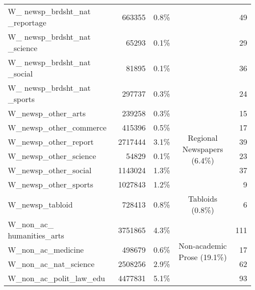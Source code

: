 {\begin{tabular}{lrrcr}
        W\_ newsp\_brdsht\_nat \_reportage & 663355   & 0.8\%   &                                                         & 49    \\
        W\_ newsp\_brdsht\_nat \_science   & 65293    & 0.1\%   &                                                         & 29    \\
        W\_ newsp\_brdsht\_nat \_social    & 81895    & 0.1\%   &                                                         & 36    \\
        W\_ newsp\_brdsht\_nat \_sports    & 297737   & 0.3\%   &                                                         & 24    \\ \cline{4-4}
        W\_newsp\_other\_arts              & 239258   & 0.3\%   & \multirow{6}{*}{\parbox{2.1cm}{Regional Newspapers (6.4\%)}}    & 15    \\
        W\_newsp\_other\_commerce          & 415396   & 0.5\%   &                                                         & 17    \\
        W\_newsp\_other\_report            & 2717444  & 3.1\%   &                                                         & 39    \\
        W\_newsp\_other\_science           & 54829    & 0.1\%   &                                                         & 23    \\
        W\_newsp\_other\_social            & 1143024  & 1.3\%   &                                                         & 37    \\
        W\_newsp\_other\_sports            & 1027843  & 1.2\%   &                                                         & 9     \\ \cline{4-4}
        W\_newsp\_tabloid                  & 728413   & 0.8\%   & Tabloids (0.8\%)                                        & 6     \\ \cline{4-4}
        W\_non\_ac\_ humanities\_arts      & 3751865  & 4.3\%   & \multirow{6}{*}{\parbox{2.1cm}{Non-academic Prose (19.1\%)}}            & 111   \\
        W\_non\_ac\_medicine               & 498679   & 0.6\%   &                                                         & 17    \\
        W\_non\_ac\_nat\_science           & 2508256  & 2.9\%   &                                                         & 62    \\
        W\_non\_ac\_polit\_law\_edu        & 4477831  & 5.1\%   &                                                         & 93    \\

\end{tabular}}
